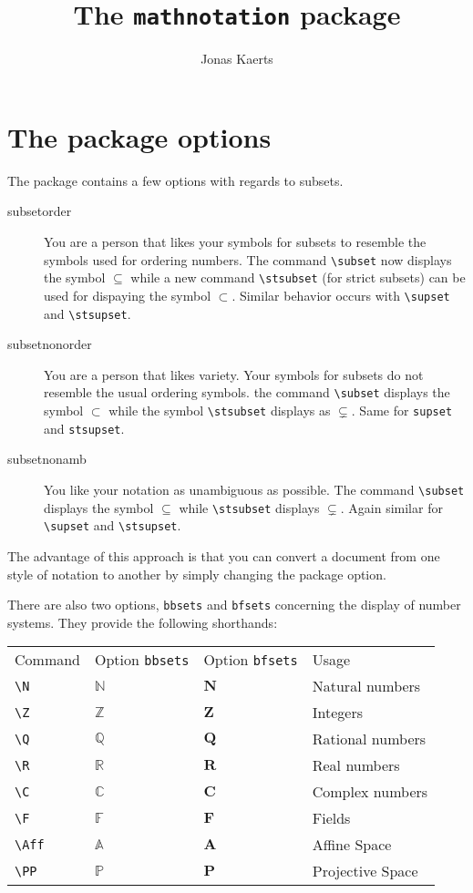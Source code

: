 \documentclass[12pt,a4paper]{article}
\author{Jonas Kaerts}
\title{The \texttt{mathnotation} package}
\begin{document}
\maketitle

\section{The package options}
The package contains a few options with regards to subsets.
\begin{description}
    \item[subsetorder] You are a person that likes your symbols for subsets to resemble the symbols used for ordering numbers.
    The command \verb|\subset| now displays the symbol $\subseteq$ while a new command \verb|\stsubset| (for strict subsets) can be used for dispaying the symbol $\subset$.
    Similar behavior occurs with \verb|\supset| and \verb|\stsupset|.
    \item[subsetnonorder] You are a person that likes variety.
    Your symbols for subsets do not resemble the usual ordering symbols.
    the command \verb|\subset| displays the symbol $\subset$ while the symbol \verb|\stsubset| displays as $\subsetneq$.
    Same for \verb|supset| and \verb|stsupset|.
    \item[subsetnonamb] You like your notation as unambiguous as possible.
    The command \verb|\subset| displays the symbol $\subseteq$ while \verb|\stsubset| displays $\subsetneq$.
    Again similar for \verb|\supset| and \verb|\stsupset|.
\end{description}
The advantage of this approach is that you can convert a document from one style of notation to another by simply changing the package option.

There are also two options, \verb|bbsets| and \verb|bfsets| concerning the display of number systems.
They provide the following shorthands:

\begin{tabular}{llll}
    Command & Option \verb|bbsets|& Option \verb|bfsets| & Usage\\
    \verb|\N| & $\mathbb{N}$ & $\mathbf{N}$ & Natural numbers\\
    \verb|\Z| & $\mathbb{Z}$ & $\mathbf{Z}$ & Integers\\
    \verb|\Q| & $\mathbb{Q}$ & $\mathbf{Q}$ & Rational numbers\\
    \verb|\R| & $\mathbb{R}$ & $\mathbf{R}$ & Real numbers\\
    \verb|\C| & $\mathbb{C}$ & $\mathbf{C}$ & Complex numbers\\
    \verb|\F| & $\mathbb{F}$ & $\mathbf{F}$ & Fields\\
    \verb|\Aff| & $\mathbb{A}$ & $\mathbf{A}$ & Affine Space\\
    \verb|\PP| & $\mathbb{P}$ & $\mathbf{P}$ & Projective Space\\
\end{tabular}
\end{document}
